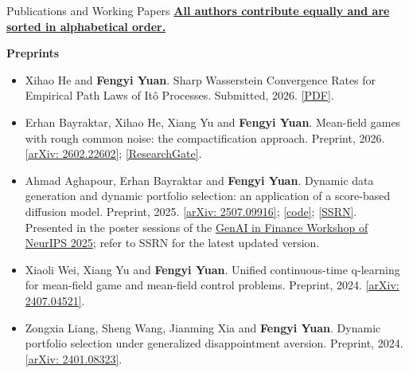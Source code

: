 \documentclass[
	11pt, %
]{resume} %
\begin{document}
\begin{rSection}{Publications and Working Papers}
\underline{\textbf{All authors contribute equally and are sorted in alphabetical order.}}

\textbf{Preprints}
\begin{itemize}
    \item Xihao He and \textbf{Fengyi Yuan}. Sharp Wasserstein Convergence Rates for Empirical Path Laws of It\^o Processes. Submitted, 2026. \href{https://fy-yuan.github.io/assets/path_law_empirical.pdf}{[PDF]}.
    \item Erhan Bayraktar, Xihao He, Xiang Yu and \textbf{Fengyi Yuan}. Mean-field games with rough common noise: the compactification approach. Preprint, 2026. \href{https://arxiv.org/abs/2602.22602}{[arXiv: 2602.22602]}; \href{https://www.researchgate.net/publication/401238560_Mean-field_games_with_rough_common_noise_the_compactification_approach}{[ResearchGate]}.
    \item Ahmad Aghapour, Erhan Bayraktar and \textbf{Fengyi Yuan}. Dynamic data generation and dynamic portfolio selection: an application of a score-based diffusion model. Preprint, 2025. \href{https://arxiv.org/abs/2507.09916}{[arXiv: 2507.09916]}; \href{https://github.com/fy-yuan/diffusion_dynamic_mv}{[code]}; \href{https://papers.ssrn.com/sol3/papers.cfm?abstract_id=5350795}{[SSRN]}. Presented in the poster sessions of the \href{https://sites.google.com/view/neurips-25-gen-ai-in-finance/accepted-papers}{GenAI in Finance Workshop of NeurIPS 2025}; refer to SSRN for the latest updated version.
    \item Xiaoli Wei, Xiang Yu and \textbf{Fengyi Yuan}. Unified continuous-time q-learning for mean-field game and mean-field control problems. Preprint, 2024. \href{https://arxiv.org/abs/2407.04521}{[arXiv: 2407.04521]}.
    \item Zongxia Liang, Sheng Wang, Jianming Xia and \textbf{Fengyi Yuan}. Dynamic portfolio selection under generalized disappointment aversion. Preprint, 2024. \href{https://arxiv.org/abs/2401.08323}{[arXiv: 2401.08323]}.
\end{itemize}


\end{rSection}
\end{document}
